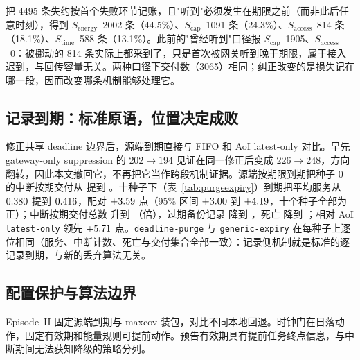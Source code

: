 \documentclass[11pt]{article}
\newcommand{\stime}{$S_{\mathrm{time}}$\xspace}
\newcommand{\scap}{$S_{\mathrm{cap}}$\xspace}
\newcommand{\senergy}{$S_{\mathrm{energy}}$\xspace}
\newcommand{\saccess}{$S_{\mathrm{access}}$\xspace}
\begin{document}
把 4495 条失约按首个失败环节记账，且"听到"必须发生在期限之前（而非此后任意时刻），得到 \senergy~2002 条（44.5\%）、\scap~1091 条（24.3\%）、\saccess~814 条（18.1\%）、\stime~588 条（13.1\%）。此前的"曾经听到"口径报 \scap~1905、\saccess~0：被挪动的 814 条实际上都采到了，只是首次被网关听到晚于期限，属于接入迟到，与回传容量无关。两种口径下交付数（3065）相同；纠正改变的是损失记在哪一段，因而改变哪条机制能够处理它。

\subsection{记录到期：标准原语，位置决定成败}
\label{sec:eval-record}
修正共享 deadline 边界后，源端到期直接与 FIFO 和 AoI latest-only 对比。早先 gateway-only suppression 的 $202\to194$ 见证在同一修正后变成 $226\to248$，方向翻转，因此本文撤回它，不再把它当作跨段机制证据。源端按期限到期把种子 0 的中断按期交付从 \cThreeSeedZeroFifo 提到 \cThreeSeedZeroPurge。十种子下（表~\ref{tab:purgeexpiry}）到期把平均服务从 $0.380$ 提到 $0.416$，配对 $+3.59$ 点（95\% 区间 $+3.00$ 到 $+4.19$，十个种子全部为正）；中断按期交付总数 \cThreeTenSeedFifo 升到 \cThreeTenSeedPurge（\cThreeRatio 倍），过期备份记录 \cThreeExpiredFifo 降到 \cThreeExpiredPurge，死亡 \cThreeDeathsFifo 降到 \cThreeDeathsPurge；相对 AoI \texttt{latest-only} 领先 $+5.71$ 点。\texttt{deadline-purge} 与 \texttt{generic-expiry} 在每种子上逐位相同（服务、中断计数、死亡与交付集合全部一致）：记录侧机制就是标准的逐记录到期，与新的丢弃算法无关。

\begin{table}[t]
\centering\small
\caption{固定强 maxcov 选择器的十种子 Episode~I 扫描，只变边缘处置。早先仅网关抑制的见证在修正 gateway deadline 边界后发生符号翻转，故不再用于当前主张。$^{\dagger}$标准 BPv7 式逐记录生命期；$^{\ddagger}$按义务索引的核销，与 $^{\dagger}$ 逐位相同。}
\label{tab:purgeexpiry}
\setlength{\tabcolsep}{4pt}

\end{table}

\subsection{配置保护与算法边界}
\label{sec:eval-lease}
Episode~II 固定源端到期与 maxcov 装包，对比不同本地回退。时钟门在日落动作，固定有效期和能量规则可提前动作。预告有效期具有提前任务终点信息，与中断期间无法获知降级的策略分列。

\begin{table}[t]
\centering\small
\caption{两个中断相位的配置回退对照（\cFiveSeeds 个种子，固定 \texttt{generic-expiry} 与 maxcov）。TTL 从密采生效起算。预告有效期行为任务~1 信息条件，其余自适应与 TTL 行为任务~2。三条已报告能量变体逐格结果相同，故只列一行。实测零死亡不构成普遍存活保证。}
\label{tab:lease}

\end{table}
\end{document}
